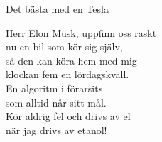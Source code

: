 \begin{song}{Det bästa med en Tesla}

	
	
	Herr Elon Musk, uppfinn oss raskt\\
	nu en bil som kör sig själv,\\
	så den kan köra hem med mig\\
	klockan fem en lördagskväll.\\
	En algoritm i förarsits\\
	som alltid når sitt mål.\\
	Kör aldrig fel och drivs av el\\
	när jag drivs av etanol!

	
\end{song}

